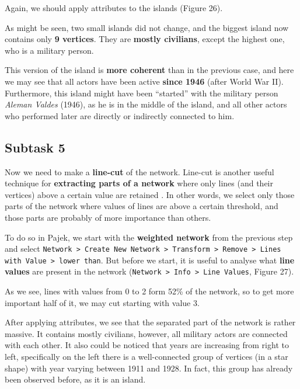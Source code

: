 \FloatBarrier

Again, we should apply attributes to the islands (Figure 26).

\FloatBarrier

As might be seen, two small islands did not change, and the biggest island now contains only \textbf{9 vertices}. They are \textbf{mostly civilians}, except the highest one, who is a military person.

This version of the island is \textbf{more coherent} than in the previous case, and here we may see that all actors have been active \textbf{since 1946} (after World War II). Furthermore, this island might have been “started” with the military person \textit{Aleman Valdes} (1946), as he is in the middle of the island, and all other actors who performed later are directly or indirectly connected to him.
\clearpage


\subsection{Subtask 5}

Now we need to make a \textbf{line-cut} of the network. Line-cut is another useful technique for \textbf{extracting parts of a network} where only lines (and their vertices) above a certain value are retained \cite{batagelj_doreian_ferligoj_kejzar_2014}. In other words, we select only those parts of the network where values of lines are above a certain threshold, and those parts are probably of more importance than others.

To do so in Pajek, we start with the \textbf{weighted network} from the previous step and select \texttt{Network > Create New Network > Transform > Remove > Lines with Value > lower than}. But before we start, it is useful to analyse what \textbf{line values} are present in the network (\texttt{Network > Info > Line Values}, Figure 27).

\FloatBarrier

As we see, lines with values from 0 to 2 form 52\% of the network, so to get more important half of it, we may cut starting with value 3.

\FloatBarrier

After applying attributes, we see that the separated part of the network is rather massive. It contains mostly civilians, however, all military actors are connected with each other. It also could be noticed that years are increasing from right to left, specifically on the left there is a well-connected group of vertices (in a star shape) with year varying between 1911 and 1928. In fact, this group has already been observed before, as it is an island.

